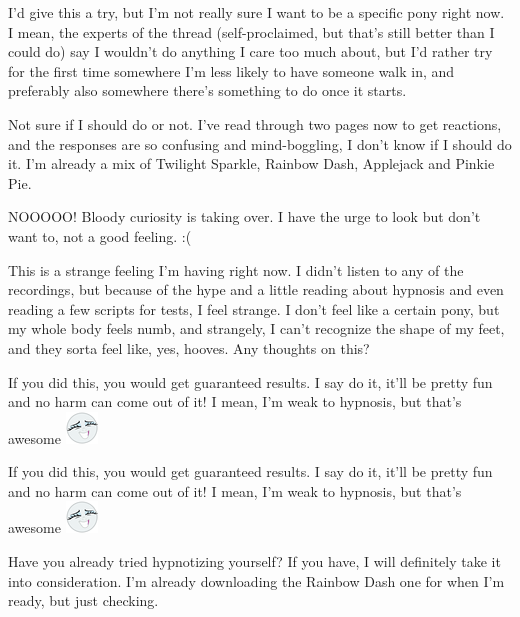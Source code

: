 \documentclass[ebook,12pt,oneside,openany]{memoir}
\begin{document}
\begin{tcolorbox}[title=Kamil]
\par{I'd give this a try, but I'm not really sure I want to be a specific pony right now. I mean, the experts of the thread (self-proclaimed, but that's still better than I could do) say I wouldn't do anything I care too much about, but I'd rather try for the first time somewhere I'm less likely to have someone walk in, and preferably also somewhere there's something to do once it starts.}
\end{tcolorbox}
\begin{tcolorbox}[title=Devvy \ding{170}Flutties\ding{170},colback=teal!5!white,colframe=teal!75!black,coltitle=white]
\begin{tcolorbox}[title=Opalicious]
\par{Not sure if I should do or not. I've read through two pages now to get reactions, and the responses are so confusing and mind-boggling, I don't know if I should do it. I'm already a mix of Twilight Sparkle, Rainbow Dash, Applejack and Pinkie Pie.}
\newline{}
\par{NOOOOO! Bloody curiosity is taking over. I have the urge to look but don't want to, not a good feeling. :(}
\newline{}
\par{This is a strange feeling I'm having right now. I didn't listen to any of the recordings, but because of the hype and a little reading about hypnosis and even reading a few scripts for tests, I feel strange. I don't feel like a certain pony, but my whole body feels numb, and strangely, I can't recognize the shape of my feet, and they sorta feel like, yes, hooves. Any thoughts on this?}
\end{tcolorbox}
\par{If you did this, you would get guaranteed results. I say do it, it'll be pretty fun and no harm can come out of it! I mean, I'm weak to hypnosis, but that's awesome \includegraphics{images/mlp_8pfRZzv.png}}
\end{tcolorbox}
\begin{tcolorbox}[title=Opalicious,colback=violet!5!white,colframe=violet!75!black,coltitle=white]
\begin{tcolorbox}[title=Dev]
\par{If you did this, you would get guaranteed results. I say do it, it'll be pretty fun and no harm can come out of it! I mean, I'm weak to hypnosis, but that's awesome \includegraphics{images/mlp_8pfRZzv.png}}
\end{tcolorbox}
\par{Have you already tried hypnotizing yourself? If you have, I will definitely take it into consideration. I'm already downloading the Rainbow Dash one for when I'm ready, but just checking.}
\end{tcolorbox}
\end{document}

